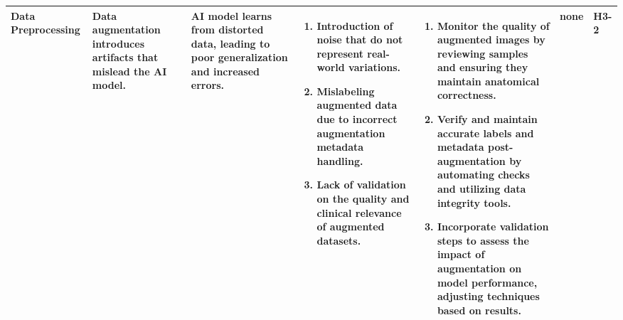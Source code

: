 \documentclass{article}
\begin{document}
\begin{landscape}
\begin{table}[ht]
{\begin{tabular}{|p{2.5cm}|p{2.5cm}|p{3cm}|p{5cm}|p{6cm}|p{1cm}|p{1cm}|}
    Data Preprocessing
     & Data augmentation introduces artifacts that mislead the AI model.
     & AI model learns from distorted data, leading to poor generalization and increased errors.
     &
     \begin{enumerate}[leftmargin=*, label={\alph*.}, itemsep=1pt]
         \item Introduction of noise that do not represent real-world variations.
         \item Mislabeling augmented data due to incorrect augmentation metadata handling.
         \item Lack of validation on the quality and clinical relevance of augmented datasets.
     \end{enumerate}
     &
     \begin{enumerate}[leftmargin=*, label={\alph*.}, itemsep=1pt]
         \item Monitor the quality of augmented images by reviewing samples and ensuring they maintain anatomical correctness.
         \item Verify and maintain accurate labels and metadata post-augmentation by automating checks and utilizing data integrity tools.
         \item Incorporate validation steps to assess the impact of augmentation on model performance, adjusting techniques based on results.
     \end{enumerate}
     & none & H3-2 \\ \hline

    \end{tabular}
    }
    \end{table}
\end{landscape}
\end{document}
